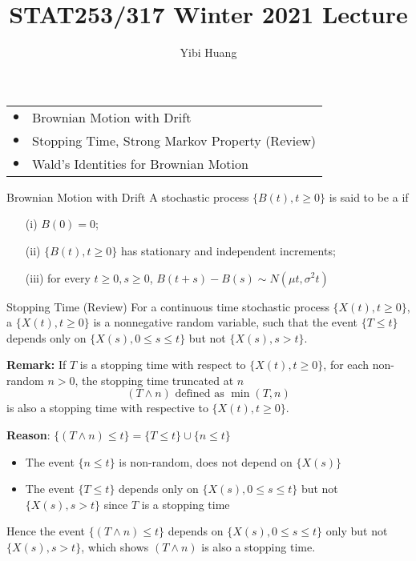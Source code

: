 \documentclass[letterpaper,handout]{beamer}
\title{STAT253/317 Winter 2021 Lecture \chapnum} \date{} \author{Yibi Huang}
\begin{document}
\begin{frame}\maketitle
\bigskip
\begin{center}\large
\begin{tabular}{ll}
$\bullet$ & Brownian Motion with Drift\\
$\bullet$ & Stopping Time, Strong Markov Property (Review)\\
$\bullet$ & Wald's Identities for Brownian Motion\\
\end{tabular}
\end{center}
\end{frame}
\begin{frame}{Brownian Motion with Drift}
A stochastic process $\{B(t), t \ge 0\}$ is said to be a  if
\begin{itemize}
\item[(i)] $B(0) = 0$;
\item[(ii)] $\{B(t), t \ge 0\}$ has stationary and independent increments;
\item[(iii)] for every $t \ge 0, s\ge 0$, $B(t+s)-B(s)\sim N(\mu t,\sigma^2 t)$
\end{itemize}
\end{frame}
\begin{frame}{Stopping Time (Review)}\normalsize
For a continuous time stochastic process $\{X(t),t\ge 0\}$,
a  $\{X(t),t\ge 0\}$ is a nonnegative random variable, such that
the event $\{T\le t\}$ depends only on $\{X(s),0\le s\le t\}$ but not $\{X(s), s> t\}$.\bigskip

\textbf{Remark:} If $T$ is a stopping time with respect to $\{X(t),t\ge 0\}$, for each non-random $n>0$,
the stopping time truncated at $n$
$$(T\wedge n)\mbox{ defined as } \min(T,n)$$
is also a stopping time with respective to $\{X(t),t\ge 0\}$.

{\bf Reason}:
$\{(T\wedge n)\le t\} = \{T\le t\}\cup\{n\le t\}$
\begin{itemize}
\item The event $\{n\le t\}$ is non-random, does not depend on $\{X(s)\}$
\item The event $\{T\le t\}$ depends only on $\{X(s),0\le s\le t\}$ but not $\{X(s), s>t\}$ since $T$ is a stopping time
\end{itemize}
Hence the event $\{(T\wedge n)\le t\}$ depends on $\{X(s),0\le s\le t\}$ only but not $\{X(s), s> t\}$,
which shows $(T\wedge n)$ is also a stopping time.
\end{frame}
\end{document}
